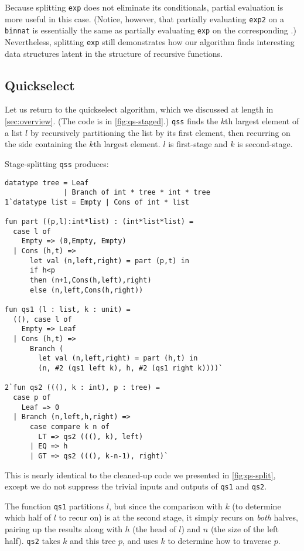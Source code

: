 Because splitting \texttt{exp} does not eliminate its conditionals, partial
evaluation is more useful in this case. (Notice, however, that partially
evaluating \texttt{exp2} on a \texttt{binnat} is essentially the same as 
partially evaluating \texttt{exp} on the corresponding \rmint.) Nevertheless,
splitting \texttt{exp} still demonstrates how our algorithm finds interesting
data structures latent in the structure of recursive functions.

\subsection{Quickselect}
\label {sec:exampleQS}

Let us return to the quickselect algorithm, which we discussed at
length in \ref{sec:overview}. (The code is in \ref{fig:qs-staged}.)
\texttt{qss} finds the $k$th largest element of a list $l$ by
recursively partitioning the list by its first element, then recurring
on the side containing the $k$th largest element. $l$ is first-stage and $k$ is
second-stage.

Stage-splitting \texttt{qss} produces:
%
\begin{lstlisting} 
datatype tree = Leaf
              | Branch of int * tree * int * tree
1`datatype list = Empty | Cons of int * list

fun part ((p,l):int*list) : (int*list*list) = 
  case l of 
    Empty => (0,Empty, Empty) 
  | Cons (h,t) => 
      let val (n,left,right) = part (p,t) in 
      if h<p 
      then (n+1,Cons(h,left),right) 
      else (n,left,Cons(h,right))

fun qs1 (l : list, k : unit) = 
  ((), case l of
    Empty => Leaf
  | Cons (h,t) => 
      Branch (
        let val (n,left,right) = part (h,t) in
        (n, #2 (qs1 left k), h, #2 (qs1 right k))))`

2`fun qs2 (((), k : int), p : tree) = 
  case p of
    Leaf => 0
  | Branch (n,left,h,right) =>
      case compare k n of 
        LT => qs2 (((), k), left) 
      | EQ => h 
      | GT => qs2 (((), k-n-1), right)`
\end{lstlisting}
%
This is nearly identical to the cleaned-up code we presented in
\ref{fig:qs-split}, except we do not suppress the trivial inputs and outputs of 
\texttt{qs1} and \texttt{qs2}.

The function \texttt{qs1} partitions $l$, but since the comparison with $k$ (to
determine which half of $l$ to recur on) is at the second stage, it simply
recurs on \emph{both} halves, pairing up the results along with $h$ (the head of
$l$) and $n$ (the size of the left half). \texttt{qs2} takes $k$ and this tree
$p$, and uses $k$ to determine how to traverse $p$.

